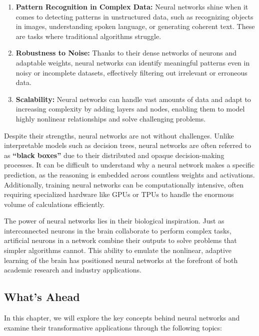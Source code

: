 \documentclass[
]{book}
\providecommand{\tightlist}{%
  \setlength{\itemsep}{0pt}\setlength{\parskip}{0pt}}
\theoremstyle{definition}
\theoremstyle{definition}
\theoremstyle{definition}
\theoremstyle{definition}
\theoremstyle{remark}
\begin{document}
\begin{enumerate}
\def\labelenumi{\arabic{enumi}.}
\tightlist
\item
  \textbf{Pattern Recognition in Complex Data:} Neural networks shine when it comes to detecting patterns in unstructured data, such as recognizing objects in images, understanding spoken language, or generating coherent text. These are tasks where traditional algorithms struggle.\\
\item
  \textbf{Robustness to Noise:} Thanks to their dense networks of neurons and adaptable weights, neural networks can identify meaningful patterns even in noisy or incomplete datasets, effectively filtering out irrelevant or erroneous data.\\
\item
  \textbf{Scalability:} Neural networks can handle vast amounts of data and adapt to increasing complexity by adding layers and nodes, enabling them to model highly nonlinear relationships and solve challenging problems.
\end{enumerate}

Despite their strengths, neural networks are not without challenges. Unlike interpretable models such as decision trees, neural networks are often referred to as \textbf{``black boxes''} due to their distributed and opaque decision-making processes. It can be difficult to understand why a neural network makes a specific prediction, as the reasoning is embedded across countless weights and activations. Additionally, training neural networks can be computationally intensive, often requiring specialized hardware like GPUs or TPUs to handle the enormous volume of calculations efficiently.

The power of neural networks lies in their biological inspiration. Just as interconnected neurons in the brain collaborate to perform complex tasks, artificial neurons in a network combine their outputs to solve problems that simpler algorithms cannot. This ability to emulate the nonlinear, adaptive learning of the brain has positioned neural networks at the forefront of both academic research and industry applications.

\subsection*{What's Ahead}\label{whats-ahead}

In this chapter, we will explore the key concepts behind neural networks and examine their transformative applications through the following topics:
\end{document}
